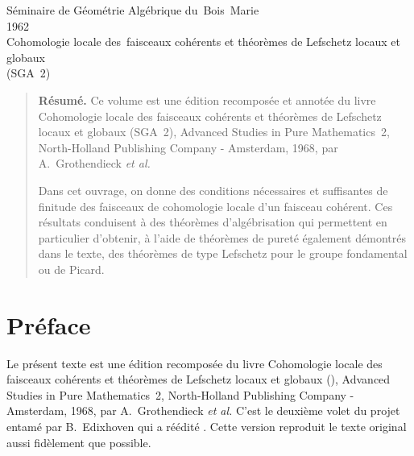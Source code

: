 
\frontmatter

 {S\'eminaire de G\'eom\'etrie Alg\'ebrique du~Bois~Marie \\
1962 \\
Cohomologie locale des~faisceaux coh\'erents et th\'eor\`emes de Lefschetz locaux et globaux \\(SGA~2)}





\begin{quote}\textbf{Résumé.} 
Ce volume est une \'edition recompos\'ee et annot\'ee du livre \og Cohomologie locale des faisceaux coh\'erents et th\'eor\`emes de Lefschetz locaux et globaux (SGA~2)\fg, Advanced Studies in Pure Mathematics~2, North-Holland Publishing Company - Amsterdam, 1968, par A.~Grothendieck \textit{et al.}

Dans cet ouvrage, on donne des conditions n\'ecessaires et suffisantes de finitude des faisceaux de cohomologie locale d'un faisceau coh\'erent. Ces r\'esultats conduisent \`a des th\'eor\`emes d'alg\'ebrisation qui permettent en particulier d'obtenir, \`a l'aide de th\'eor\`emes de puret\'e \'egalement d\'emontr\'es dans le texte, des th\'eor\`emes de type Lefschetz pour le groupe fondamental ou de Picard.
\end{quote}









\maketitle

\cleardoublepage
\renewcommand{\baselinestretch}{1.1}\normalfont
\chapter*{Pr\'eface}
\thispagestyle{empty}
Le pr\'esent texte est une \'edition recompos\'ee \ignorespaces du livre \og Cohomologie locale des faisceaux coh\'erents et th\'eor\`emes de Lefschetz locaux et globaux ()\fg, Advanced Studies in Pure Mathematics~2, North-Holland Publishing Company - Amsterdam, 1968, par A.\, Grothendieck \textit{et al.} C'est le deuxi\`eme volet du projet entam\'e par B.\, Edixhoven qui a r\'e\'edit\'e . Cette version reproduit le texte original aussi fid\`element que possible.

